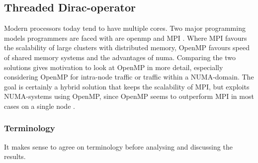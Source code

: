 \documentclass{article}
\theoremstyle{plain} %
\theoremstyle{convention} %
\theoremstyle{remark} %
\numberwithin{equation}{section}
\begin{document}
\subsection{Threaded Dirac-operator}

\label{sec:threads}

Modern processors today tend to have multiple cores. Two major programming models programmers are faced with are \acrshort{openmp} \cite{openmp45} and \acrshort{MPI} \cite{mpi}. Where MPI favours the scalability of large clusters with distributed memory, OpenMP favours speed of shared memory systems and the advantages of \acrfull{numa}. Comparing the two solutions gives motivation to look at OpenMP in more detail, especially considering OpenMP for intra-node traffic or traffic within a NUMA-domain. The goal is certainly a hybrid solution that keeps the scalability of MPI, but exploits NUMA-systems using OpenMP, since OpenMP seems to outperform MPI in most cases on a single node \cite{chan2011}.

\subsubsection{Terminology}

It makes sense to agree on terminology before analysing and discussing the results.
\end{document}

